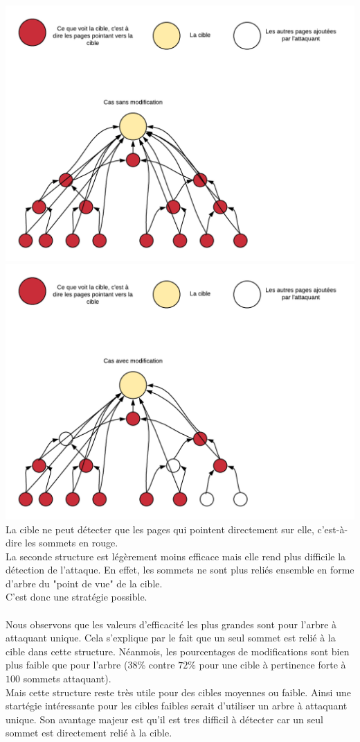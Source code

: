 \documentclass[a4paper,11pt]{article}
\begin{document}
		\includegraphics[scale = 0.5]{Captures/diagramme1.png}\\
		\includegraphics[scale = 0.5]{Captures/diagramme2.png}\\
		La cible ne peut détecter que les pages qui pointent directement sur elle, c'est-à-dire les sommets en rouge.\\
		La seconde structure est légèrement moins efficace mais elle rend plus difficile la détection de l'attaque. En effet, les sommets ne sont plus reliés ensemble en forme d'arbre du "point de vue" de la cible.\\
		C'est donc une stratégie possible.\\
		\\
		Nous observons que les valeurs d'efficacité les plus grandes sont pour l'arbre à attaquant unique. Cela s'explique par le fait que un seul sommet est relié à la cible dans cette structure. Néanmois, les pourcentages de modifications sont bien plus faible que pour l'arbre ($38$\% contre $72$\% pour une cible à pertinence forte à $100$ sommets attaquant).\\
		Mais cette structure reste très utile pour des cibles moyennes ou faible. Ainsi une startégie intéressante pour les cibles faibles serait d'utiliser un arbre à attaquant unique. Son avantage majeur est qu'il est tres difficil à détecter car un seul sommet est directement relié à la cible.
	
\end{document}

